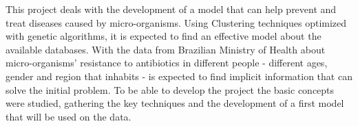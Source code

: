 This project deals with the development of a model that can help prevent and treat diseases caused by micro-organisms. Using Clustering techniques optimized with genetic algorithms, it is expected to find an effective model about the available databases. With the data from Brazilian Ministry of Health about micro-organisms' resistance to  antibiotics in different people - different ages, gender and region that inhabits - is expected to find implicit information that can solve the initial problem. To be able to develop the project the basic concepts were studied, gathering the key techniques and the development of a first model that will be used on the data.